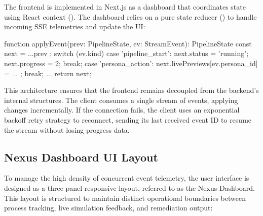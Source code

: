 The frontend is implemented in Next.js as a dashboard that coordinates state using React context (). The dashboard relies on a pure state reducer () to handle incoming SSE telemetries and update the UI:

\begin{code}
function applyEvent(prev: PipelineState, ev: StreamEvent): PipelineState {
  const next = { ...prev };
  switch (ev.kind) {
    case 'pipeline_start':
      next.status = 'running';
      next.progress = 2;
      break;
    case 'persona_action':
      next.livePreviews[ev.persona_id] = { ... };
      break;
    ...
  }
  return next;
}
\end{code}

This architecture ensures that the frontend remains decoupled from the backend's internal structures. The client consumes a single stream of events, applying changes incrementally. If the connection fails, the client uses an exponential backoff retry strategy to reconnect, sending its last received event ID to resume the stream without losing progress data.


\subsection{Nexus Dashboard UI Layout}
\label{sec:dashboard-layout}

To manage the high density of concurrent event telemetry, the \versimux{} user interface is designed as a three-panel responsive layout, referred to as the Nexus Dashboard. This layout is structured to maintain distinct operational boundaries between process tracking, live simulation feedback, and remediation output:

